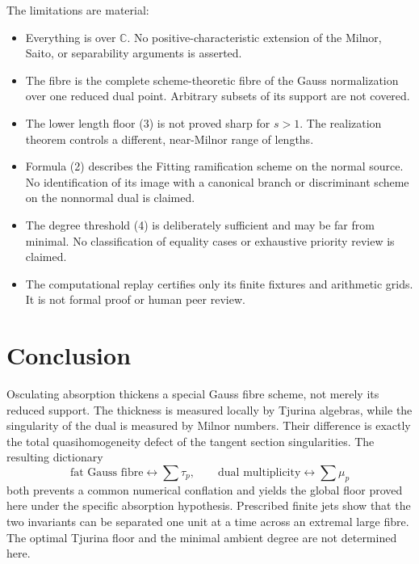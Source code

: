 \documentclass[11pt,a4paper]{article}
\theoremstyle{definition}
\newcommand{\kk}{\mathbb C}
\begin{document}
The limitations are material:
\begin{itemize}
\item Everything is over $\kk$.  No positive-characteristic extension of
      the Milnor, Saito, or separability arguments is asserted.
\item The fibre is the complete scheme-theoretic fibre of the Gauss
      normalization over one reduced dual point.  Arbitrary subsets of its
      support are not covered.
\item The lower length floor (3) is not proved sharp for $s>1$.  The
      realization theorem controls a different, near-Milnor range of lengths.
\item Formula (2) describes the Fitting ramification scheme on the normal
      source.  No identification of its image with a canonical branch or
      discriminant scheme on the nonnormal dual is claimed.
\item The degree threshold (4) is deliberately sufficient and may be far
      from minimal.  No classification of equality cases or exhaustive
      priority review is claimed.
\item The computational replay certifies only its finite fixtures and
      arithmetic grids.  It is not formal proof or human peer review.
\end{itemize}

\section{Conclusion}

Osculating absorption thickens a special Gauss fibre scheme, not merely its
reduced support.  The thickness is measured locally by Tjurina algebras,
while the singularity of the dual is measured by Milnor numbers.  Their
difference is exactly the total quasihomogeneity defect of the tangent
section singularities.  The resulting dictionary
\[
 \text{fat Gauss fibre}\longleftrightarrow\sum\tau_p,
 \qquad
 \text{dual multiplicity}\longleftrightarrow\sum\mu_p
\]
both prevents a common numerical conflation and yields the global floor
proved here under the specific absorption hypothesis.  Prescribed finite
jets show that the two invariants can be separated one unit at a time across
an extremal large fibre.  The optimal Tjurina floor and the minimal ambient
degree are not determined here.
\end{document}
